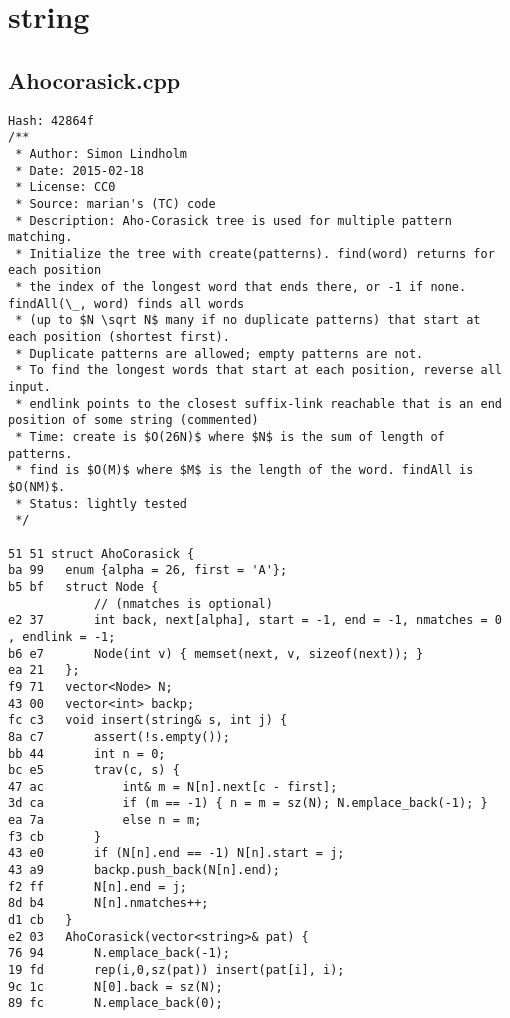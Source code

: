 \documentclass[11pt, a4paper, twoside]{article}
\begin{document}
%
%

\section{string}

\subsection{Ahocorasick.cpp}
\begin{lstlisting}
Hash: 42864f
/**
 * Author: Simon Lindholm
 * Date: 2015-02-18
 * License: CC0
 * Source: marian's (TC) code
 * Description: Aho-Corasick tree is used for multiple pattern matching.
 * Initialize the tree with create(patterns). find(word) returns for each position
 * the index of the longest word that ends there, or -1 if none. findAll(\_, word) finds all words
 * (up to $N \sqrt N$ many if no duplicate patterns) that start at each position (shortest first).
 * Duplicate patterns are allowed; empty patterns are not.
 * To find the longest words that start at each position, reverse all input.
 * endlink points to the closest suffix-link reachable that is an end position of some string (commented)
 * Time: create is $O(26N)$ where $N$ is the sum of length of patterns.
 * find is $O(M)$ where $M$ is the length of the word. findAll is $O(NM)$.
 * Status: lightly tested
 */

51 51 struct AhoCorasick {
ba 99 	enum {alpha = 26, first = 'A'};
b5 bf 	struct Node {
      		// (nmatches is optional)
e2 37 		int back, next[alpha], start = -1, end = -1, nmatches = 0 , endlink = -1;
b6 e7 		Node(int v) { memset(next, v, sizeof(next)); }
ea 21 	};
f9 71 	vector<Node> N;
43 00 	vector<int> backp;
fc c3 	void insert(string& s, int j) {
8a c7 		assert(!s.empty());
bb 44 		int n = 0;
bc e5 		trav(c, s) {
47 ac 			int& m = N[n].next[c - first];
3d ca 			if (m == -1) { n = m = sz(N); N.emplace_back(-1); }
ea 7a 			else n = m;
f3 cb 		}
43 e0 		if (N[n].end == -1) N[n].start = j;
43 a9 		backp.push_back(N[n].end);
f2 ff 		N[n].end = j;
8d b4 		N[n].nmatches++;
d1 cb 	}
e2 03 	AhoCorasick(vector<string>& pat) {
76 94 		N.emplace_back(-1);
19 fd 		rep(i,0,sz(pat)) insert(pat[i], i);
9c 1c 		N[0].back = sz(N);
89 fc 		N.emplace_back(0);
      

\end{lstlisting}
\end{document}
